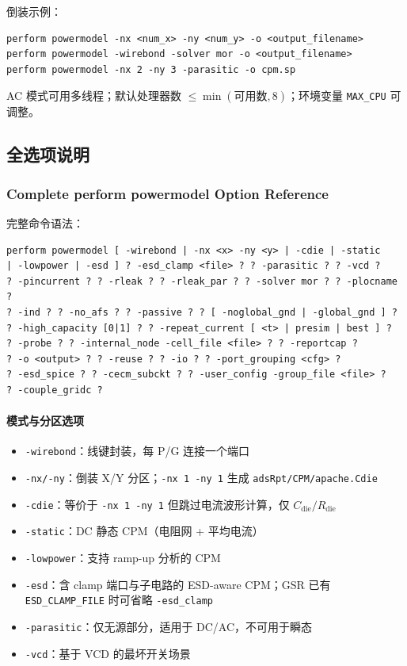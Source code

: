 倒装示例：
\begin{lstlisting}
perform powermodel -nx <num_x> -ny <num_y> -o <output_filename>
perform powermodel -wirebond -solver mor -o <output_filename>
perform powermodel -nx 2 -ny 3 -parasitic -o cpm.sp
\end{lstlisting}

AC 模式可用多线程；默认处理器数 $\le \min(\text{可用数}, 8)$；环境变量 \texttt{MAX\_CPU} 可调整。
\subsection{ 全选项说明}
\subsubsection*{Complete perform powermodel Option Reference}

完整命令语法：
\begin{lstlisting}
perform powermodel [ -wirebond | -nx <x> -ny <y> | -cdie | -static
| -lowpower | -esd ] ? -esd_clamp <file> ? ? -parasitic ? ? -vcd ?
? -pincurrent ? ? -rleak ? ? -rleak_par ? ? -solver mor ? ? -plocname ?
? -ind ? ? -no_afs ? ? -passive ? ? [ -noglobal_gnd | -global_gnd ] ?
? -high_capacity [0|1] ? ? -repeat_current [ <t> | presim | best ] ?
? -probe ? ? -internal_node -cell_file <file> ? ? -reportcap ?
? -o <output> ? ? -reuse ? ? -io ? ? -port_grouping <cfg> ?
? -esd_spice ? ? -cecm_subckt ? ? -user_config -group_file <file> ?
? -couple_gridc ?
\end{lstlisting}

\paragraph{模式与分区选项}
\begin{itemize}
  \item \texttt{-wirebond}：线键封装，每 P/G 连接一个端口
  \item \texttt{-nx/-ny}：倒装 X/Y 分区；\texttt{-nx 1 -ny 1} 生成 \texttt{adsRpt/CPM/apache.Cdie}
  \item \texttt{-cdie}：等价于 \texttt{-nx 1 -ny 1} 但跳过电流波形计算，仅 $C_{\mathrm{die}}/R_{\mathrm{die}}$
  \item \texttt{-static}：DC 静态 CPM（电阻网 + 平均电流）
  \item \texttt{-lowpower}：支持 ramp-up 分析的 CPM
  \item \texttt{-esd}：含 clamp 端口与子电路的 ESD-aware CPM；GSR 已有 \texttt{ESD\_CLAMP\_FILE} 时可省略 \texttt{-esd\_clamp}
  \item \texttt{-parasitic}：仅无源部分，适用于 DC/AC，不可用于瞬态
  \item \texttt{-vcd}：基于 VCD 的最坏开关场景
\end{itemize}

